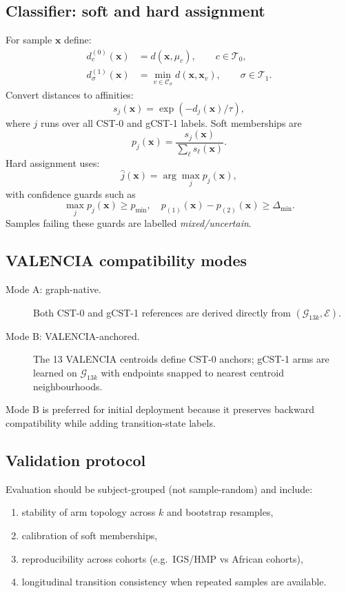 \documentclass[11pt]{article}
\theoremstyle{plain}
\newcommand{\E}{\mathcal{E}}
\newcommand{\G}{\mathcal{G}}
\begin{document}
\subsection{Classifier: soft and hard assignment}

For sample $\mathbf{x}$ define:
\begin{align*}
  d^{(0)}_c(\mathbf{x}) &= d(\mathbf{x},\mu_c), \qquad c\in\mathcal{T}_0,\\
  d^{(1)}_\sigma(\mathbf{x}) &= \min_{v\in\mathcal{C}_\sigma}
    d(\mathbf{x},\mathbf{x}_v), \qquad \sigma\in\mathcal{T}_1.
\end{align*}
Convert distances to affinities:
\[
  s_j(\mathbf{x})=\exp\!\left(-d_j(\mathbf{x})/\tau\right),
\]
where $j$ runs over all CST-0 and gCST-1 labels.  Soft memberships are
\[
  p_j(\mathbf{x})=\frac{s_j(\mathbf{x})}{\sum_\ell s_\ell(\mathbf{x})}.
\]
Hard assignment uses:
\[
  \hat{j}(\mathbf{x})=\arg\max_j p_j(\mathbf{x}),
\]
with confidence guards such as
\[
  \max_j p_j(\mathbf{x})\ge p_{\min}, \quad
  p_{(1)}(\mathbf{x})-p_{(2)}(\mathbf{x})\ge \Delta_{\min}.
\]
Samples failing these guards are labelled \emph{mixed/uncertain}.

\subsection{VALENCIA compatibility modes}

\begin{description}
  \item[Mode A: graph-native.] Both CST-0 and gCST-1 references are derived
        directly from $(\G_{13k},\E)$.
  \item[Mode B: VALENCIA-anchored.] The 13 VALENCIA centroids define CST-0
        anchors; gCST-1 arms are learned on $\G_{13k}$ with endpoints snapped
        to nearest centroid neighbourhoods.
\end{description}

Mode B is preferred for initial deployment because it preserves backward
compatibility while adding transition-state labels.

\subsection{Validation protocol}

Evaluation should be subject-grouped (not sample-random) and include:
\begin{enumerate}[noitemsep]
  \item stability of arm topology across $k$ and bootstrap resamples,
  \item calibration of soft memberships,
  \item reproducibility across cohorts (e.g.\ IGS/HMP vs African cohorts),
  \item longitudinal transition consistency when repeated samples are available.
\end{enumerate}
\end{document}
